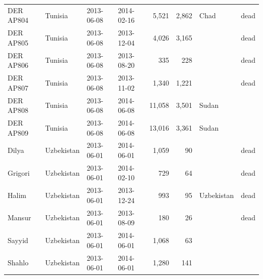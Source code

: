 \documentclass[11pt,a4paper]{article}
\begin{document}
{\begin{longtable}{llllrrll}
DER AP804 & Tunisia & 2013-06-08 & 2014-02-16 & 5,521 & 2,862 & Chad & dead\\
DER AP805 & Tunisia & 2013-06-08 & 2013-12-04 & 4,026 & 3,165 &  & dead\\
DER AP806 & Tunisia & 2013-06-08 & 2013-08-20 & 335 & 228 &  & dead\\
DER AP807 & Tunisia & 2013-06-08 & 2013-11-02 & 1,340 & 1,221 &  & dead\\
DER AP808 & Tunisia & 2013-06-08 & 2014-06-08 & 11,058 & 3,501 & Sudan & \\
DER AP809 & Tunisia & 2013-06-08 & 2014-06-08 & 13,016 & 3,361 & Sudan & \\
Dilya & Uzbekistan & 2013-06-01 & 2014-06-01 & 1,059 & 90 &  & dead\\
Grigori & Uzbekistan & 2013-06-01 & 2014-02-10 & 729 & 64 &  & dead\\
Halim & Uzbekistan & 2013-06-01 & 2013-12-24 & 993 & 95 & Uzbekistan & dead\\
Mansur & Uzbekistan & 2013-06-01 & 2013-08-09 & 180 & 26 &  & dead\\
Sayyid & Uzbekistan & 2013-06-01 & 2014-06-01 & 1,068 & 63 &  & \\
Shahlo & Uzbekistan & 2013-06-01 & 2014-06-01 & 1,280 & 141 &  & \\
\bottomrule\end{longtable}}
\end{document}
